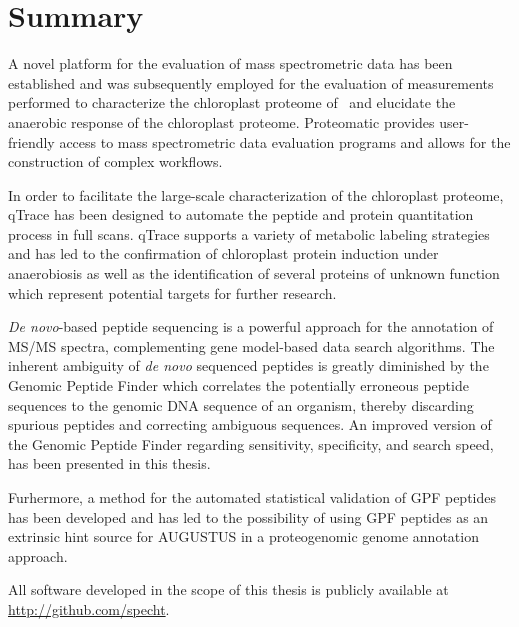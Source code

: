 \cleardoublepage
\chapter{Summary}

A novel platform for the evaluation of mass spectrometric data has been
established and was subsequently employed for the evaluation of measurements
performed to characterize the chloroplast proteome of \cre~and elucidate
the anaerobic response of the chloroplast proteome.
Proteomatic provides user-friendly access to mass spectrometric data 
evaluation programs and allows for the construction of complex workflows.

In order to facilitate the large-scale characterization of the chloroplast
proteome, qTrace has been designed to automate the peptide and protein 
quantitation process in full scans.
qTrace supports a variety of metabolic labeling strategies and has 
led to the confirmation of chloroplast protein induction under anaerobiosis
as well as the identification of several proteins of unknown function
which represent potential targets for further research.

{\em De novo}-based peptide sequencing is a powerful approach for the annotation
of MS/MS spectra, complementing gene model-based data search algorithms.
The inherent ambiguity of {\em de novo} sequenced peptides is greatly diminished
by the Genomic Peptide Finder which correlates the potentially erroneous
peptide sequences to the genomic DNA sequence of an organism, thereby discarding
spurious peptides and correcting ambiguous sequences.
An improved version of the Genomic Peptide Finder regarding sensitivity, 
specificity, and search speed, has been presented in this thesis.

Furhermore, a method for the automated statistical validation of GPF peptides
has been developed and has led to the possibility of using GPF peptides as
an extrinsic hint source for AUGUSTUS in a proteogenomic genome annotation 
approach.

All software developed in the scope of this thesis is publicly available
at \href{http://github.com/specht}{http://github.com/specht}.
